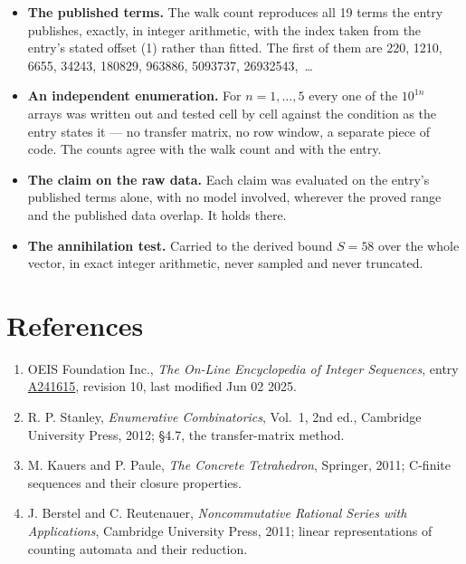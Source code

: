 \documentclass[11pt]{article}
\theoremstyle{definition}
\begin{document}
\begin{itemize}

\item {\bfseries The published terms.} The walk count reproduces all 19 terms the entry publishes, exactly, in integer arithmetic, with the index taken from the entry's stated offset (1) rather than fitted. The first of them are 220, 1210, 6655, 34243, 180829, 963886, 5093737, 26932543,~\dots

\item {\bfseries An independent enumeration.} For $n = 1,\dots,5$ every one of the $10^{1n}$ arrays was written out and tested cell by cell against the condition as the entry states it --- no transfer matrix, no row window, a separate piece of code. The counts agree with the walk count and with the entry.

\item {\bfseries The claim on the raw data.} Each claim was evaluated on the entry's published terms alone, with no model involved, wherever the proved range and the published data overlap. It holds there.

\item {\bfseries The annihilation test.} Carried to the derived bound $S = 58$ over the whole vector, in exact integer arithmetic, never sampled and never truncated.

\end{itemize}

\section{References}

\begin{enumerate}

\item OEIS Foundation Inc., \emph{The On-Line Encyclopedia of Integer Sequences}, entry \href{https://oeis.org/A241615}{A241615}, revision 10, last modified Jun 02 2025.

\item R. P. Stanley, \emph{Enumerative Combinatorics}, Vol.~1, 2nd ed., Cambridge University Press, 2012; \S4.7, the transfer-matrix method.

\item M. Kauers and P. Paule, \emph{The Concrete Tetrahedron}, Springer, 2011; C-finite sequences and their closure properties.

\item J. Berstel and C. Reutenauer, \emph{Noncommutative Rational Series with Applications}, Cambridge University Press, 2011; linear representations of counting automata and their reduction.

\end{enumerate}
\end{document}
